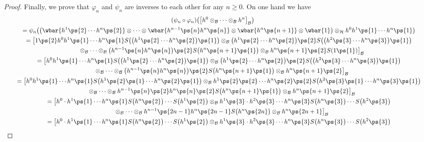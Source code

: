\begin{proof}
Finally, we prove that $\varphi_n$ and $\psi_n$ are inverses to each other for any $n\geq 0$.
On one hand we have
\begin{gather*}
(\psi_n \circ \varphi_n)\big(\big[h^0\otimes_{\cal B}\cdots\otimes_{\cal B} h^n\big]_{\cal B} \big)
\\
\qquad
=\psi_n\big(\big(\wbar{h^1\ps{2}\cdots h^n\ps{2}} \otimes\cdots\otimes \wbar{h^{n-1}\ps{n}h^n\ps{n}} \otimes
\wbar{h^n\ps{n+1}} \otimes \wbar{1}\big) \otimes_{\cal H} h^0h^1\ps{1}\cdots h^n\ps{1} \big)
\\
\qquad
=\big[1\ps{2}h^0h^1\ps{1}\cdots h^n\ps{1}S\big(\big(h^1\ps{2}\cdots h^n\ps{2}\big)\ps{1}\big)\otimes_{\cal B} \big(h^1\ps{2}\cdots
h^n\ps{2}\big)\ps{2}S\big(\big(h^2\ps{3}\cdots h^n\ps{3}\big)\ps{1}\big)
\\
\qquad\phantom{=}{}
\otimes_{\cal B}\cdots \otimes_{\cal B} \big(h^{n-1}\ps{n}h^n\ps{n}\big)\ps{2}S\big(h^n\ps{n+1}\ps{1}\big)\otimes_{\cal B}
h^n\ps{n+1}\ps{2}S(1\ps{1})\big]_{\cal B}
\\
\qquad
=\big[h^0h^1\ps{1}\cdots h^n\ps{1}S\big(\big(h^1\ps{2}\cdots h^n\ps{2}\big)\ps{1}\big)\otimes_{\cal B} \big(h^1\ps{2}\cdots
h^n\ps{2}\big)\ps{2}S\big(\big(h^2\ps{3}\cdots h^n\ps{3}\big)\ps{1}\big)
\\
\qquad\phantom{=}{}
\otimes_{\cal B}\cdots \otimes_{\cal B} \big(h^{n-1}\ps{n}h^n\ps{n}\big)\ps{2}S\big(h^n\ps{n+1}\ps{1}\big)\otimes_{\cal B}
h^n\ps{n+1}\ps{2}\big]_{\cal B}
\\
\qquad
=\big[h^0h^1\ps{1}\cdots h^n\ps{1}S\big(h^1\ps{2}\ps{1}\cdots h^n\ps{2}\ps{1}\big)\otimes_{\cal B} h^1\ps{2}\ps{2}\cdots
h^n\ps{2}\ps{2}S\big(h^2\ps{3}\ps{1}\cdots h^n\ps{3}\ps{1}\big)
\\
\qquad\phantom{=}{}
\otimes_{\cal B}\cdots \otimes_{\cal B} h^{n-1}\ps{n}\ps{2}h^n\ps{n}\ps{2}S\big(h^n\ps{n+1}\ps{1}\big)\otimes_{\cal B}
h^n\ps{n+1}\ps{2}\big]_{\cal B}
\\
\qquad
=\big[h^0\cdot h^1\ps{1}\cdots h^n\ps{1}S\big(h^n\ps{2}\big)\cdots S\big(h^1\ps{2}\big)\otimes_{\cal B} h^1\ps{3}\cdot
h^2\ps{3}\cdots h^n\ps{3}S\big(h^n\ps{3}\big)\cdots S\big(h^2\ps{3}\big)
\\
\qquad\phantom{=}{}
\otimes_{\cal B}\cdots \otimes_{\cal B} h^{n-1}\ps{2n-1}h^n\ps{2n-1}S\big(h^n\ps{2n}\big)\otimes_{\cal B} h^n\ps{2n+1}\big]_{\cal B}
\\
\qquad
=\big[h^0\cdot h^1\ps{1}\cdots h^n\ps{1}S\big(h^n\ps{2}\big)\cdots S\big(h^1\ps{2}\big)\otimes_{\cal B} h^1\ps{3}\cdot
h^2\ps{3}\cdots h^n\ps{3}S\big(h^n\ps{3}\big)\cdots S\big(h^2\ps{3}\big)
\\

\end{gather*}
\end{proof}
